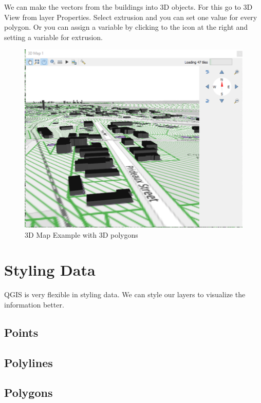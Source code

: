 \documentclass[
]{book}
\begin{document}
We can make the vectors from the buildings into 3D objects. For this go to 3D View from layer Properties. Select extrusion and you can set one value for every polygon. Or you can assign a variable by clicking to the icon at the right and setting a variable for extrusion.

\begin{figure}
\centering
\includegraphics{Images/3Dbuildings.png}
\caption{3D Map Example with 3D polygons}
\end{figure}

\hypertarget{styling-data}{%
\chapter{Styling Data}\label{styling-data}}

QGIS is very flexible in styling data. We can style our layers to visualize the information better.

\hypertarget{points}{%
\section{Points}\label{points}}

\hypertarget{polylines}{%
\section{Polylines}\label{polylines}}

\hypertarget{polygons}{%
\section{Polygons}\label{polygons}}
\end{document}

